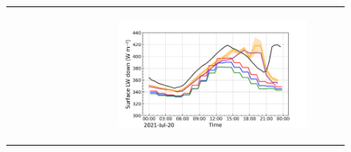 \begin{figure}[hbtp]
\begin{tabular}{cc}
\begin{subfigure}[t]{0.5\textwidth}
        \end{subfigure} &
        \begin{subfigure}[t]{0.5\textwidth}
            \caption{}
            \includegraphics[width=\textwidth]{images/chap5/IOP_TS/TS_2021-07-20_cendrosa_LWdnSFC.png}
        \end{subfigure} \\


\end{tabular}
\end{figure}
